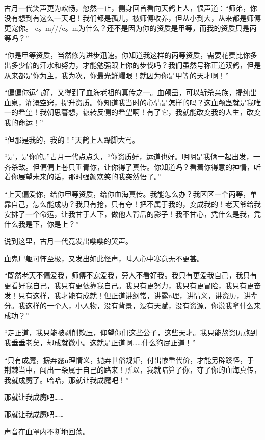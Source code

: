 
\begin{this_body}

古月一代笑声更为欢畅，忽然一止，侧身回首看向天鹤上人，恨声道：“师弟，你没有想到有这么一天吧！我们都是孤儿，被师傅收养，但从小到大，从来都是师傅更宠你。 c。m///c。m为什么？还不是因为你的资质是甲等，而我的资质只是丙等吗？”

“你是甲等资质，当然修为进步迅速。你知道我这样的丙等资质，需要花费比你多出多少倍的汗水和努力，才能勉强跟上你的步伐吗？我们虽然号称正道双鹤，但是从来都是你为主，我为次，你最光鲜耀眼！就因为你是甲等的天才啊！”

“偏偏你运气好，又得到了血海老祖的真传之一。血颅蛊，可以斩杀亲族，提纯出血泉，灌溉空窍，提升资质。你知道我当时的心情是怎样的吗？这血颅蛊就是我唯一的希望！我朝思暮想，辗转反侧的希望啊！有了它，我就能改变我的人生，改变我的命运！”

“但那是我的，我的！”天鹤上人跺脚大骂。

“是，是你的。”古月一代点点头，“你资质好，运道也好。明明是我俩一起出发，一齐杀敌。但偏偏上苍只垂青你，让你得了真传。你知道吗？看着你得意的神情，听着你展望未来的话，那时强颜欢笑的我突然悟了。”

“上天偏爱你，给你甲等资质，给你血海真传。我能怎么办？我区区一个丙等，单靠自己，怎么能成功？我只有抢，只有夺！把不属于我的，变成我的！老天爷给我安排了一个命运，让我甘于人下，做他人背后的影子！我不甘心，凭什么是我，凭什么我是下，你是上？”

说到这里，古月一代竟发出嘤嘤的哭声。

血鬼尸躯可怖至极，又发出如此怪声，叫人心中寒意无不更甚。

“既然老天不偏爱我，师傅不宠爱我，旁人不看好我。我只有更爱我自己，我只有更看好我自己，我只有更依靠我自己。我只有更努力，我只有更冒险，我只有更奋发！只有这样，我才能有成就！但正道讲纲常，讲露n理，讲情义，讲资历，讲辈分。我这样的一个人，小人物，没有背景，没有天赋，没有资源，你说我拿什么来成功？”

“走正道，我只能被剥削欺压，仰望你们这些公子，这些天才。我只能熬资历熬到我垂垂老矣，却成就微小。这就是正道啊……什么狗屁正道！”

“只有成魔，摒弃露n理情义，抛弃世俗规矩，付出惨重代价，才能另辟蹊径，于荆棘当中，闯出一条属于自己的路来！所以，我就暗算了你，夺了你的血海真传，我就成魔了。哈哈，那就让我成魔吧！”

那就让我成魔吧……

那就让我成魔吧……

声音在血罩内不断地回荡。


\end{this_body}
